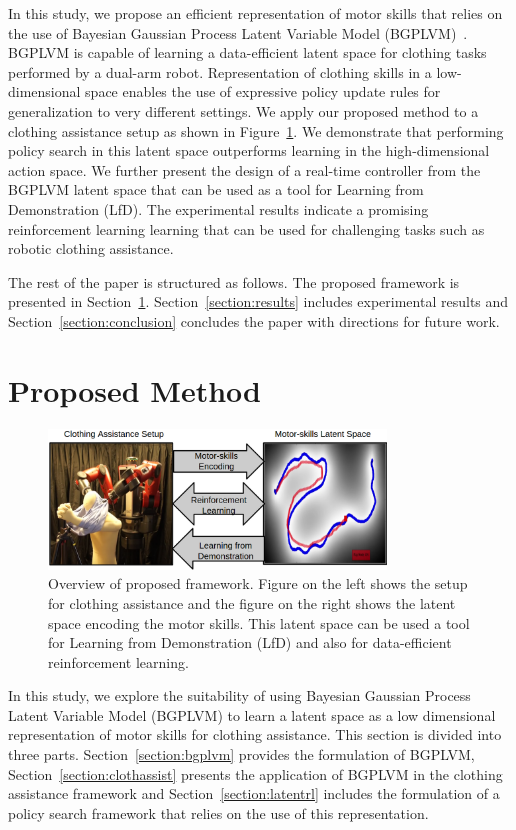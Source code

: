 \documentclass{article}
\begin{document}
In this study, we propose an efficient representation of motor skills that relies on the use of Bayesian Gaussian Process Latent Variable Model (BGPLVM)~\cite{bgplvm}. BGPLVM is capable of learning a data-efficient latent space for clothing tasks performed by a dual-arm robot. Representation of clothing skills in a low-dimensional space enables the use of expressive policy update rules for generalization to very different settings. We apply our proposed method to a clothing assistance setup as shown in Figure~\ref{figure:overview}. We demonstrate that performing policy search in this latent space outperforms learning in the high-dimensional action space. We further present the design of a real-time controller from the BGPLVM latent space that can be used as a tool for Learning from Demonstration (LfD). The experimental results indicate a promising reinforcement learning learning that can be used for challenging tasks such as robotic clothing assistance.

The rest of the paper is structured as follows. The proposed framework is presented in Section~\ref{section:method}. Section~\ref{section:results} includes experimental results and Section~\ref{section:conclusion} concludes the paper with directions for future work.

\section{Proposed Method}
\label{section:method}

\begin{figure}
  \centering
  \includegraphics[width=0.8\textwidth]{overview.png}
  \caption{Overview of proposed framework. Figure on the left shows the setup for clothing assistance and the figure on the right shows the latent space encoding the motor skills. This latent space can be used a tool for Learning from Demonstration (LfD) and also for data-efficient reinforcement learning.}
  \label{figure:overview}
\end{figure}
In this study, we explore the suitability of using Bayesian Gaussian Process Latent Variable Model (BGPLVM) to learn a latent space as a low dimensional representation of motor skills for clothing assistance. This section is divided into three parts. Section~\ref{section:bgplvm} provides the formulation of BGPLVM, Section~\ref{section:clothassist} presents the application of BGPLVM in the clothing assistance framework and Section~\ref{section:latentrl} includes the formulation of a policy search framework that relies on the use of this representation.
\end{document}
